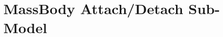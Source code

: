 %

\renewcommand\modelpartname{MassBody Attach/Detach Sub-Model}
\renewcommand\modelpartid{BodyAttach_Detach}
\part{\modelpartname}\label{part:\modelpartid}





